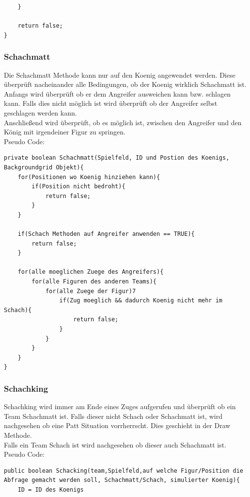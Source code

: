 \documentclass[12pt,a4paper]{article}
\begin{document}
{\begin{lstlisting}
	}
	
	return false;	
}
\end{lstlisting}

\subsubsection{Schachmatt}
\label{SUBSUBSEC:checkmate}

Die Schachmatt Methode kann nur auf den Koenig angewendet werden. Diese überprüft nacheinander alle Bedingungen, ob der Koenig wirklich Schachmatt ist. Anfangs wird überprüft ob er dem Angreifer ausweichen kann bzw. schlagen kann. Falls dies nicht möglich ist wird überprüft ob der Angreifer selbst geschlagen werden kann. \\
Anschließend wird überprüft, ob es möglich ist, zwischen den Angreifer und den König mit irgendeiner Figur zu springen. \\
Pseudo Code:

\lstset{language=Java}
\begin{lstlisting}
private boolean Schachmatt(Spielfeld, ID und Postion des Koenigs, Backgroundgrid Objekt){
	for(Positionen wo Koenig hinziehen kann){
		if(Position nicht bedroht){
			return false;
		}
	}
	
	if(Schach Methoden auf Angreifer anwenden == TRUE){
		return false;
	}
	
	for(alle moeglichen Zuege des Angreifers){
		for(alle Figuren des anderen Teams){
			for(alle Zuege der Figur)7
				if(Zug moeglich && dadurch Koenig nicht mehr im Schach){
					return false;
				}
			}			
		}
	}
}
\end{lstlisting}


\subsubsection{Schachking}
\label{SUBSUBSEC:checkking}

Schachking wird immer am Ende eines Zuges aufgerufen und überprüft ob ein Team Schachmatt ist. Falls dieser nicht Schach oder Schachmatt ist, wird nachgesehen ob eine Patt Situation vorrherrscht. Dies geschieht in der Draw Methode. \\
Falls ein Team Schach ist wird nachgesehen ob dieser auch Schachmatt ist. \\
Pseudo Code:

\lstset{language=Java}
\begin{lstlisting}
public boolean Schacking(team,Spielfeld,auf welche Figur/Position die Abfrage gemacht werden soll, Schachmatt/Schach, simulierter Koenig){
	ID = ID des Koenigs
	

\end{lstlisting}}
\end{document}
